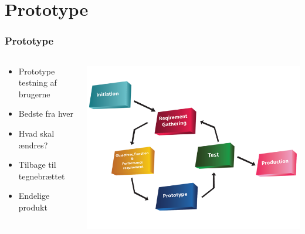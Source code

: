 \documentclass{beamer}
\begin{document}
\section{Prototype}
\begin{frame}
\frametitle{Prototype}
  \begin{columns}[T]
    \begin{column}{.5\textwidth}
	  \begin{itemize}
		\item Prototype testning af brugerne
		\item Bedste fra hver
		\item Hvad skal ændres?
		\item Tilbage til tegnebrættet
		\item Endelige produkt
	  \end{itemize}
    \end{column}
    \begin{column}{.4\textwidth}
      \includegraphics[width=\textwidth]{prototyping.png}
    \end{column}
  \end{columns}
\end{frame}
\end{document}
